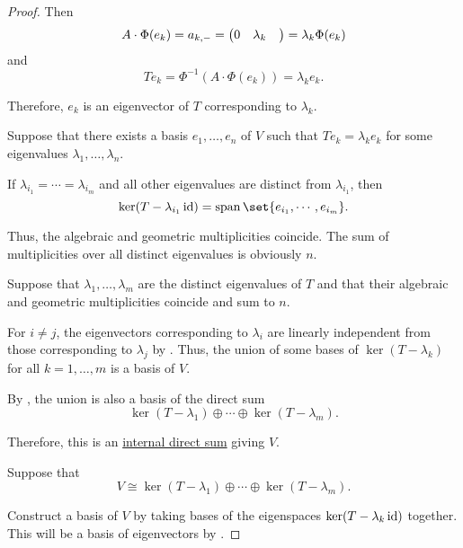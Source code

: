 \begin{proof}
  Then
  \begin{equation*}
    A \cdot \Phi(e_k) = a_{k,\anon*} = \begin{pmatrix} 0 & \lambda_k & \end{pmatrix} = \lambda_k \Phi(e_k)
  \end{equation*}
  and
  \begin{equation*}
    T e_k = \Phi^{-1}(A \cdot \Phi(e_k)) = \lambda_k e_k.
  \end{equation*}

  Therefore, \( e_k \) is an eigenvector of \( T \) corresponding to \( \lambda_k \).

   Suppose that there exists a basis \( e_1, \ldots, e_n \) of \( V \) such that \( Te_k = \lambda_k e_k \) for some eigenvalues \( \lambda_1, \ldots, \lambda_n \).

  If \( \lambda_{i_1} = \cdots = \lambda_{i_m} \) and all other eigenvalues are distinct from \( \lambda_{i_1} \), then
  \begin{equation*}
    \ker(T - \lambda_{i_1} \id) = \linspan\set{ e_{i_1}, \cdots, e_{i_m} }.
  \end{equation*}

  Thus, the algebraic and geometric multiplicities coincide. The sum of multiplicities over all distinct eigenvalues is obviously \( n \).

   Suppose that \( \lambda_1, \ldots, \lambda_m \) are the distinct eigenvalues of \( T \) and that their algebraic and geometric multiplicities coincide and sum to \( n \).

  For \( i \neq j \), the eigenvectors corresponding to \( \lambda_i \) are linearly independent from those corresponding to \( \lambda_j \) by . Thus, the union of some bases of \( \ker(T - \lambda_k) \) for all \( k = 1, \ldots, m \) is a basis of \( V \).

  By , the union is also a basis of the direct sum
  \begin{equation*}
    \ker(T - \lambda_1) \oplus \cdots \oplus \ker(T - \lambda_m).
  \end{equation*}

  Therefore, this is an \hyperref[def:semimodule_direct_sum]{internal direct sum} giving \( V \).

   Suppose that
  \begin{equation*}
    V \cong \ker(T - \lambda_1) \oplus \cdots \oplus \ker(T - \lambda_m).
  \end{equation*}

  Construct a basis of \( V \) by taking bases of the eigenspaces \( \ker(T - \lambda_k \operatorname{id}) \) together. This will be a basis of eigenvectors by .
\end{proof}

